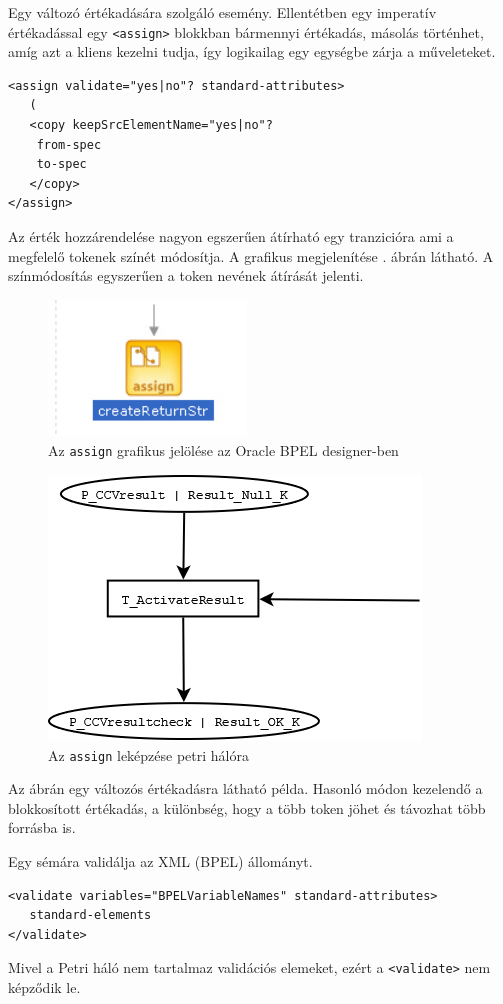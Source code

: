 Egy változó értékadására szolgáló esemény. Ellentétben egy imperatív értékadással egy \texttt{<assign>} blokkban bármennyi értékadás, másolás történhet, amíg azt a kliens kezelni tudja, így logikailag egy egységbe zárja a műveleteket.  
\begin{verbatim}
<assign validate="yes|no"? standard-attributes>
   (
   <copy keepSrcElementName="yes|no"? 
  	from-spec
  	to-spec
   </copy>
</assign>
\end{verbatim}
Az érték hozzárendelése nagyon egszerűen átírható egy tranzicióra ami a megfelelő tokenek színét módosítja. 
A grafikus megjelenítése . ábrán látható.
A színmódosítás egyszerűen a token nevének átírását jelenti. 
\begin{figure}[h!]
\centering
\includegraphics[scale=1]{images/assign.png}
\caption{Az \texttt{assign} grafikus jelölése az Oracle BPEL designer-ben}
\label{fig:assign}
\end{figure}

\begin{figure}[h!]
\centering
\includegraphics[scale=0.4]{images/assignnet.png}
\caption{Az \texttt{assign} leképzése petri hálóra}
\label{fig:assignnet}
\end{figure}
Az ábrán egy változós értékadásra látható példa. Hasonló módon kezelendő a  blokkosított értékadás, a különbség, hogy a több token jöhet és távozhat több forrásba is.

Egy sémára validálja az XML (BPEL) állományt. 
\begin{verbatim}
<validate variables="BPELVariableNames" standard-attributes>
   standard-elements
</validate>
\end{verbatim}
Mivel a Petri háló nem tartalmaz validációs elemeket, ezért a \texttt{<validate>} nem képződik le. 

